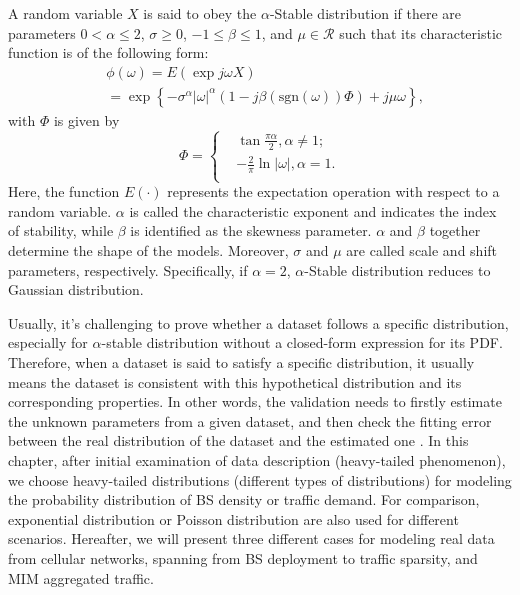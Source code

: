 \begin{definition}
	A random variable $X$ is said to obey the $\alpha$-Stable distribution if there are parameters $0<\alpha \leq 2$, $\sigma \geq 0$, $-1\leq \beta \leq 1$, and $\mu \in \mathcal{R}$ such that its characteristic function is of the following form:
	\begin{equation}
	\label{eq:cfun}
	\begin{aligned}
	&\phi(\omega)= E(\exp j\omega X)\\
	&=\exp\left\{-\sigma^{\alpha} \vert\omega\vert^{\alpha} \left(1-j\beta(\text{sgn} (\omega))\Phi \right) + j\mu \omega \right\},	
	\end{aligned}
	\end{equation}
	with $\Phi$ is given by
	\begin{equation}
	\Phi=\left\{
	\begin{aligned}
	& \tan \frac{\pi \alpha}{2}, \alpha\neq 1;\\
	& -\frac{2}{\pi} \ln\vert\omega\vert, \alpha= 1.\\
	\end{aligned}
	\right.
	\end{equation}
	Here, the function $E(\cdot)$ represents the expectation operation with respect to a random variable. $\alpha$ is called the characteristic exponent and indicates the index of stability, while $\beta$ is identified as the skewness parameter. $\alpha$ and $\beta$ together determine the shape of the models. Moreover, $\sigma$ and $\mu$ are called scale and shift parameters, respectively. Specifically, if $\alpha=2$, $\alpha$-Stable distribution reduces to Gaussian distribution.
\end{definition}

Usually, it's challenging to prove whether a dataset follows a specific distribution, especially for $\alpha$-stable distribution without a closed-form expression for its PDF. Therefore, when a dataset is said to satisfy a specific distribution, it usually means the dataset is consistent with this hypothetical distribution and its corresponding properties. In other words, the validation needs to firstly estimate the unknown parameters from a given dataset, and then check the fitting error between the real distribution of the dataset and the estimated one \cite{xiaohu2004testing}.
\vspace{-5pt}
In this chapter, after initial examination of data description (heavy-tailed phenomenon), we choose heavy-tailed distributions (different types of distributions) for modeling the probability distribution of BS density or traffic demand. For comparison, exponential distribution or Poisson distribution are also used for different scenarios. Hereafter, we will present three different cases for modeling real data from cellular networks, spanning from BS deployment to traffic sparsity, and MIM aggregated traffic.

